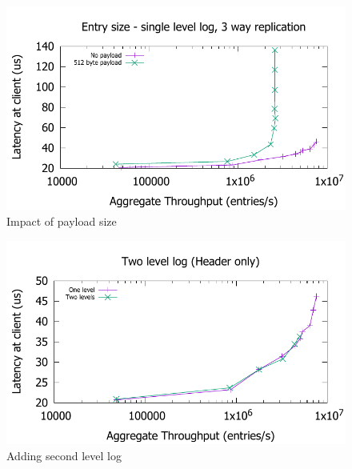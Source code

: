 \documentclass[twocolumn]{article}
\begin{document}
\begin{figure}
  \includegraphics[scale=0.6]{results2/512.pdf}
  \caption{Impact of payload size}
  \label{fig:payload}
\end{figure}

\begin{figure}
  \includegraphics[scale=0.6]{results2/flashlog.pdf}
  \caption{Adding second level log}
  \label{fig:flashlog}
\end{figure}
\end{document}
